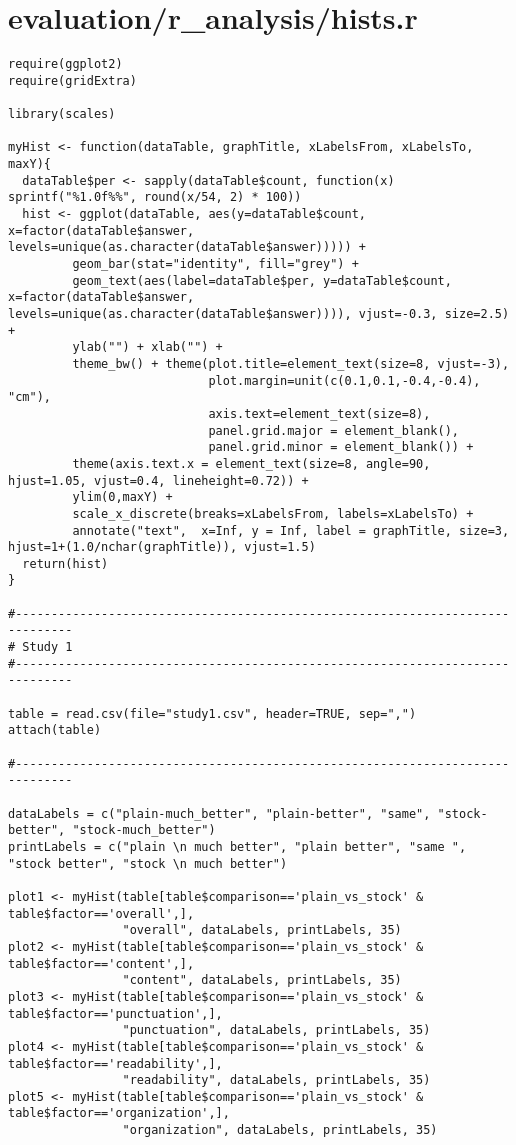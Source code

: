 \documentclass{article}
\begin{document}
\section*{evaluation/r\_analysis/hists.r}
\begin{verbatim}
require(ggplot2)
require(gridExtra)

library(scales)

myHist <- function(dataTable, graphTitle, xLabelsFrom, xLabelsTo, maxY){
  dataTable$per <- sapply(dataTable$count, function(x) sprintf("%1.0f%%", round(x/54, 2) * 100))
  hist <- ggplot(dataTable, aes(y=dataTable$count, x=factor(dataTable$answer, levels=unique(as.character(dataTable$answer))))) +
         geom_bar(stat="identity", fill="grey") +
         geom_text(aes(label=dataTable$per, y=dataTable$count, x=factor(dataTable$answer, levels=unique(as.character(dataTable$answer)))), vjust=-0.3, size=2.5) +
         ylab("") + xlab("") +
         theme_bw() + theme(plot.title=element_text(size=8, vjust=-3),
                            plot.margin=unit(c(0.1,0.1,-0.4,-0.4), "cm"),
                            axis.text=element_text(size=8),
                            panel.grid.major = element_blank(),
                            panel.grid.minor = element_blank()) +
         theme(axis.text.x = element_text(size=8, angle=90, hjust=1.05, vjust=0.4, lineheight=0.72)) +
         ylim(0,maxY) +
         scale_x_discrete(breaks=xLabelsFrom, labels=xLabelsTo) +
         annotate("text",  x=Inf, y = Inf, label = graphTitle, size=3, hjust=1+(1.0/nchar(graphTitle)), vjust=1.5)
  return(hist)
}

#------------------------------------------------------------------------------
# Study 1
#------------------------------------------------------------------------------

table = read.csv(file="study1.csv", header=TRUE, sep=",")
attach(table)

#------------------------------------------------------------------------------

dataLabels = c("plain-much_better", "plain-better", "same", "stock-better", "stock-much_better")
printLabels = c("plain \n much better", "plain better", "same ", "stock better", "stock \n much better")

plot1 <- myHist(table[table$comparison=='plain_vs_stock' & table$factor=='overall',],
                "overall", dataLabels, printLabels, 35)
plot2 <- myHist(table[table$comparison=='plain_vs_stock' & table$factor=='content',],
                "content", dataLabels, printLabels, 35)
plot3 <- myHist(table[table$comparison=='plain_vs_stock' & table$factor=='punctuation',],
                "punctuation", dataLabels, printLabels, 35)
plot4 <- myHist(table[table$comparison=='plain_vs_stock' & table$factor=='readability',],
                "readability", dataLabels, printLabels, 35)
plot5 <- myHist(table[table$comparison=='plain_vs_stock' & table$factor=='organization',],
                "organization", dataLabels, printLabels, 35)


\end{verbatim}
\end{document}
